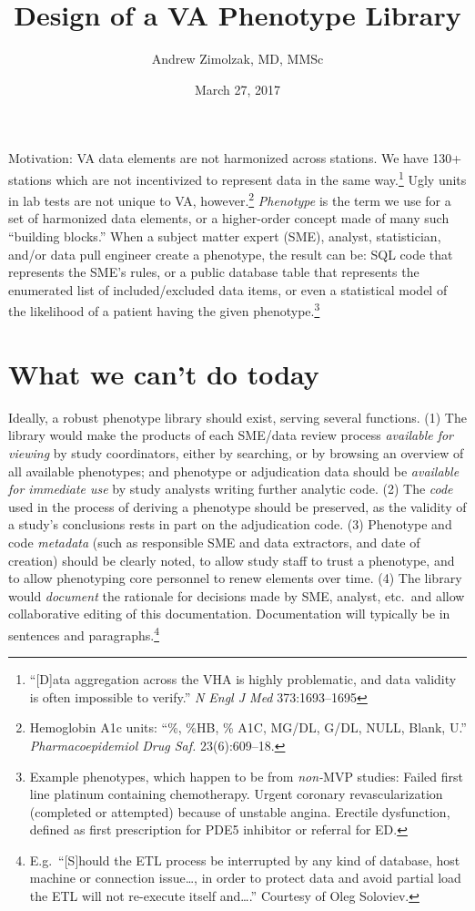 \documentclass{tufte-handout}
\title{Design of a VA Phenotype Library}
\author{Andrew Zimolzak, MD, MMSc}
\date{March 27, 2017}
\begin{document}
\maketitle

Motivation: VA data elements are not harmonized across stations. We
have 130+ stations which are not incentivized to represent data in the
same way.\footnote{``[D]ata aggregation across the VHA is highly
  problematic, and data validity is often impossible to verify.''
  \emph{N Engl J Med} 373:1693--1695} Ugly units in lab tests are not
unique to VA, however.\footnote{Hemoglobin A1c units: ``\%, \%HB, \%
  A1C, MG/DL, G/DL, NULL, Blank, U.'' \emph{Pharmacoepidemiol Drug
    Saf.} 23(6):609--18.} \emph{Phenotype} is the term we use for a
set of harmonized data elements, or a higher-order concept made of
many such ``building blocks.'' When a subject matter expert (SME),
analyst, statistician, and/or data pull engineer create a phenotype,
the result can be: SQL code that represents the SME's rules, or a
public database table that represents the enumerated list of
included/excluded data items, or even a statistical model of the
likelihood of a patient having the given phenotype.\footnote{Example
  phenotypes, which happen to be from \emph{non-}MVP studies: Failed
  first line platinum containing chemotherapy. Urgent coronary
  revascularization (completed or attempted) because of unstable
  angina. Erectile dysfunction, defined as first prescription for PDE5
  inhibitor or referral for ED.}

\section{What we can't do today}

Ideally, a robust phenotype library should exist, serving several
functions. (1) The library would make the products of each SME/data
review process \emph{available for viewing} by study coordinators,
either by searching, or by browsing an overview of all available
phenotypes; and phenotype or adjudication data should be
\emph{available for immediate use} by study analysts writing further
analytic code. (2) The \emph{code} used in the process of deriving a
phenotype should be preserved, as the validity of a study's
conclusions rests in part on the adjudication code. (3) Phenotype and
code \emph{metadata} (such as responsible SME and data extractors, and
date of creation) should be clearly noted, to allow study staff to
trust a phenotype, and to allow phenotyping core personnel to renew
elements over time. (4) The library would \emph{document} the
rationale for decisions made by SME, analyst, etc.\ and allow
collaborative editing of this documentation. Documentation will
typically be in sentences and paragraphs.\footnote{E.g.\ ``[S]hould
  the ETL process be interrupted by any kind of database, host machine
  or connection issue\ldots{}, in order to protect data and avoid
  partial load the ETL will not re-execute itself and\ldots{}.'' Courtesy
  of Oleg Soloviev.}
\end{document}
